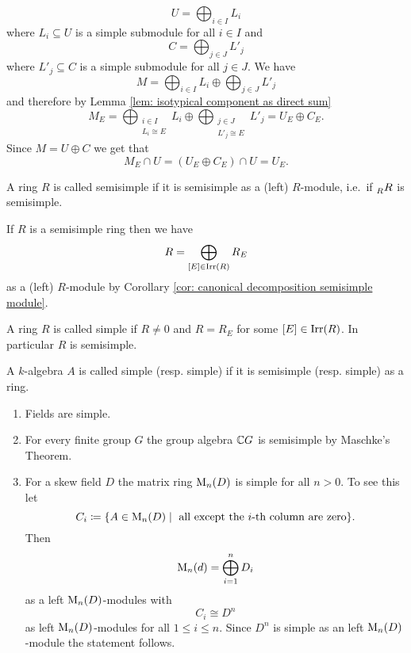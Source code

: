 \begin{rem}
\begin{enumerate}[label=\emph{\alph*)},leftmargin=*]
   \[
    U = \bigoplus_{i \in I} L_i
   \]
   where $L_i \subseteq U$ is a simple submodule for all $i \in I$ and
   \[
    C = \bigoplus_{j \in J} L'_j
   \]
   where $L'_j \subseteq C$ is a simple submodule for all $j \in J$. We have
   \[
    M = \bigoplus_{i \in I} L_i \oplus \bigoplus_{j \in J} L'_j
   \]
   and therefore by Lemma \ref{lem: isotypical component as direct sum}
   \[
    M_E
    = \bigoplus_{\substack{i \in I \\ L_i \cong E}} L_i \oplus \bigoplus_{\substack{j \in J \\ L'_j \cong E}} L'_j
    = U_E \oplus C_E.
   \]
   Since $M = U \oplus C$ we get that
   \[
    M_E \cap U = (U_E \oplus C_E) \cap U = U_E.
   \]
 \end{enumerate}
\end{rem}


\begin{defi}
 A ring $R$ is called semisimple if it is semisimple as a (left) $R$-module, i.e.\ if $\prescript{}{R}{R}$ is semisimple.
\end{defi}


If $R$ is a semisimple ring then we have
\[
 R = \bigoplus_{[E] \in \operatorname{Irr}(R)} R_E
\]
as a (left) $R$-module by Corollary \ref{cor: canonical decomposition semisimple module}.


\begin{defi}
 A ring $R$ is called simple if $R \neq 0$ and $R = R_E$ for some \mbox{$[E] \in \operatorname{Irr}(R)$}. In particular $R$ is semisimple.
\end{defi}


\begin{defi}
 A $k$-algebra $A$ is called simple (resp. simple) if it is semisimple (resp. simple) as a ring.
\end{defi}


\begin{expls}
 \begin{enumerate}[label=\emph{\alph*)},leftmargin=*]
  \item
   Fields are simple.
  \item
   For every finite group $G$ the group algebra $\mathbb{C} G$ is semisimple by Maschke’s Theorem.
  \item
   For a skew field $D$ the matrix ring $\operatorname{M}_n(D)$ is simple for all $n > 0$. To see this let
   \[
    C_i
    \coloneqq \{ A \in \operatorname{M}_n(D) \mid \text{ all except the $i$-th column are zero} \}.
   \]
   Then
   \[
    \operatorname{M}_n(d) = \bigoplus_{i=1}^n D_i
   \]
   as a left $\operatorname{M}_n(D)$-modules with
   \[
    C_i \cong D^n
   \]
   as left $\operatorname{M}_n(D)$-modules for all $1 \leq i \leq n$. Since $D^n$ is simple as an left $\operatorname{M}_n(D)$-module the statement follows.
 \end{enumerate}
\end{expls}


